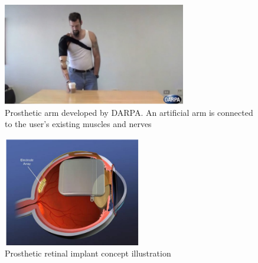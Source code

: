 \begin{figure}[H]
	\centering
		\includegraphics[width = 8cm]{prothesis_arm}
	\caption{Prosthetic arm developed by DARPA. An artificial arm is connected to the user's existing muscles and nerves\cite{prosthetic_arm}}
	\label{prosthetic_arm}
\end{figure}

\begin{figure}[H]
	\centering
	\includegraphics[width = 6cm]{prothesis_eye}
	\caption{Prosthetic retinal implant concept illustration \cite{retinal_implant}}
	\label{prosthetic_eye}
\end{figure}